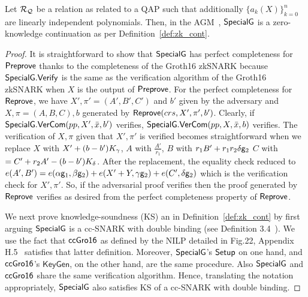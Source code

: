 \begin{theorem}
\label{sec_specialg}
Let $\mathcal{R}_{\mathcal{Q}}$ be a relation as related to a QAP such that additionally $\{a_k(X)\}_{k=0}^n$ are linearly independent polynomials. Then, in the 
AGM~\cite{Fuchs_AGM}, ${\mathsf{SpecialG}}$ is a zero-knowledge continuation as per Definition~\ref{def:zk_cont}. 
\end{theorem}
\begin{proof} It is straightforward to show that ${\mathsf{SpecialG}}$ has perfect completeness for ${\mathsf{Preprove}}$ thanks to the completeness of the Groth16 zkSNARK because $ {\mathsf{SpecialG}}.{\mathsf{Verify}} $ is the same as the verification algorithm of the Groth16 zkSNARK when $ X $ is the output of $ {\mathsf{Preprove}} $.
For the perfect completeness for ${\mathsf{Reprove}}$, we have $ X', \pi' = (A',B',C') $ and $ b' $ given by the adversary and $ X,\pi =(A,B,C),b $ generated by $ {\mathsf{Reprove}}(crs, X',\pi',b') $. Clearly, if $ {\mathsf{SpecialG}}.{\mathsf{VerCom}}(pp,X',\bar{x},b') $ verifies, $ {\mathsf{SpecialG}}.{\mathsf{VerCom}}(pp,X,\bar{x},b) $ verifies. The verification of  $ X, \pi $ given that $ X',\pi' $ is verified becomes straightforward when we replace $ X $ with $ X' + (b-b')K_{\gamma} $, $ A $ with $ \frac{A'}{r_1} $, $ B $ with $ r_1 B' + r_1r_2 \delta \mathsf{g}_2$ $C$ with $ = C' + r_2A'  - (b - b') K_{\delta} $. After the replacement, the equality check reduced to $ e (A',B') = e(\alpha\mathsf{g}_1,\beta\mathsf{g}_2) + e(X'+Y, \gamma \mathsf{g}_2) + e(C', \delta\mathsf{g}_2)$ which is the verification check for $ X', \pi' $. So, if the adversarial proof verifies then the proof generated by $ {\mathsf{Reprove}} $ verifies as desired from the perfect completeness property of $ {\mathsf{Reprove}} $.

We next prove knowledge-soundness (KS) an in Definition~\ref{def:zk_cont} by first arguing ${\mathsf{SpecialG}}$ is a cc-SNARK with double binding 
(see Definition 3.4~\cite{LegoSNARK}).  We use the fact that ${\mathsf{ccGro16}}$ as defined by the NILP detailed in Fig.22, Appendix H.5~\cite{LegoSNARK} 
satisfies that latter definition. Moreover, ${\mathsf{SpecialG}}$'s ${\mathsf{Setup}}$ on one hand, and ${\mathsf{ccGro16}}$'s $ \mathsf{KeyGen} $, on the other hand, are the same 
procedure. Also ${\mathsf{SpecialG}}$ and ${\mathsf{ccGro16}}$ share the same verification algorithm. Hence, translating the notation appropriately, ${\mathsf{SpecialG}}$ also 
satisfies KS of a cc-SNARK with double binding. 


\end{proof}
